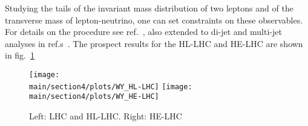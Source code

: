 Studying the tails of the invariant mass distribution of two leptons and of the transverse mass of lepton-neutrino, one can set constraints on these observables. For details on the procedure see ref.~\cite{Farina:2016rws}, also extended to di-jet and multi-jet analyses in ref.s~\cite{Alioli:2017nzr,Alioli:2017jdo}. The prospect results for the HL-LHC and HE-LHC are shown in fig.~\ref{fig:DY-WY}
\begin{figure}[ht]
\centering
\texttt{[image: \\main/section4/plots/WY\_HL-LHC]}
\texttt{[image: \\main/section4/plots/WY\_HE-LHC]}
\caption{Left: LHC and HL-LHC. Right: HE-LHC}
\label{fig:DY-WY}
\end{figure}
